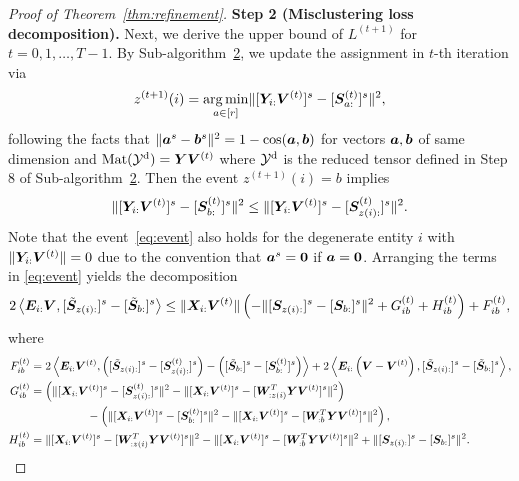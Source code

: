 \documentclass[lettersize,onecolumn,journal]{IEEEtran}
\theoremstyle{definition}
\theoremstyle{definition}
\newcommand{\of}[1]{\left(#1\right)}
\newcommand{\ang}[1]{\left\langle#1\right\rangle}
\begin{document}
\begin{proof}[Proof of Theorem~\ref{thm:refinement}]
{\bf Step 2 (Misclustering loss decomposition).} Next, we derive the upper bound of $L^{(t+1)}$ for $t = 0 ,1, \ldots, T-1$. By Sub-algorithm~\hyperref[alg:main]{2}, we update the assignment in $t$-th iteration via
    \begin{equation}
        z^{(t+1)}(i) = \operatorname*{arg\,min}_{a \in [r]} \lVert [ \bm Y_{i:} \bm{V}^{(t)}  ]^s - [\bm S_{a:}^{(t)}]^s \rVert^2,
    \end{equation}
    following the facts that $\lVert\bm{a}^s - \bm{b}^s\rVert^2 = 1 - \cos(\bm{a}, \bm{b})$ for vectors $\bm{a},\bm{b}$ of same dimension and $\text{Mat}(\mathcal{Y}^\text{d}) = \bm Y \bm{V}^{(t)}$ where $\mathcal{Y}^\text{d}$ is the reduced tensor defined in Step 8 of Sub-algorithm~\hyperref[alg:main]{2}. Then the event $z^{(t+1)}(i) = b$ implies
    \begin{equation}\label{eq:event}
        \onormSize{}{ [ \mY_{i:} \mV^{(t)}  ]^s - [\mS_{b:}^{(t)}]^s }^2 \leq \onormSize{}{ [ \mY_{i:} \mV^{(t)}  ]^s - [\mS_{z(i):}^{(t)}]^s }^2.
    \end{equation}
Note that the event~\eqref{eq:event} also holds for the degenerate entity $i$ with $\lVert\bm Y_{i:} \bm{V}^{(t)}\rVert = 0$ due to the convention that $\bm{a}^s = {\bf 0}$ if $\bm{a} = {\bf 0}$. 
    Arranging the terms in \eqref{eq:event} yields the decomposition
    \begin{equation}\label{eq:decomp}
        2 \ang{ \mE_{i:} \mV, [  \tilde \mS_{z(i):} ]^s - [  \tilde \mS_{b:} ]^s } \leq \onormSize{}{\mX_{i:} \mV^{(t)}} \of{ - \onormSize{}{ [ \mS_{z(i):}  ]^s - [ \mS_{b:}  ]^s  }^2 + G_{ib}^{(t)} + H_{ib}^{(t)} } +  F_{ib}^{(t)},
    \end{equation}
    where
    \begin{align}
        F_{ib}^{(t)} &= 2 \ang{\mE_{i:} \mV^{(t)}, \of{ [  \tilde \mS_{z(i):} ]^s  -  [  \mS_{z(i):}^{(t)} ]^s  }  - \of{  [  \tilde \mS_{b:} ]^s  -  [  \mS_{b:}^{(t)} ]^s  }  }  + 2 \ang{ \mE_{i:} \of{ \mV - \mV^{(t)} }, [  \tilde \mS_{z(i):} ]^s - [  \tilde \mS_{b:} ]^s  }, \label{eq:f}\\
        G_{ib}^{(t)} &=   \of{ \onormSize{}{ [\mX_{i:} \mV^{(t)}]^s -  [  \mS_{z(i):}^{(t)}  ]^s}^2 -  \onormSize{}{ [\mX_{i:} \mV^{(t)}]^s -  [  \mW_{:z(i)}^T \mY \mV^{(t)} ]^s}^2}   \\
        & \quad \quad \quad \quad \quad -   \of{ \onormSize{}{ [\mX_{i:} \mV^{(t)}]^s -  [  \mS_{b:}^{(t)}  ]^s}^2 -  \onormSize{}{ [\mX_{i:} \mV^{(t)}]^s -  [  \mW_{:b}^T \mY \mV^{(t)} ]^s}^2 }, \label{eq:g} \\
        H_{ib}^{(t)} &=   \onormSize{}{ [\mX_{i:} \mV^{(t)}]^s -  [  \mW_{:z(i)}^T \mY \mV^{(t)} ]^s}^2 - \onormSize{}{ [\mX_{i:} \mV^{(t)}]^s -  [  \mW_{:b}^T \mY \mV^{(t)} ]^s}^2  + \onormSize{}{ [ \mS_{z(i):}  ]^s - [ \mS_{b:}  ]^s  }^2 . \label{eq:h}
    \end{align}


\end{proof}
\end{document}
